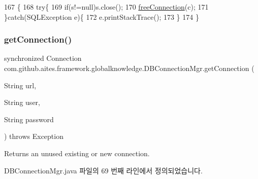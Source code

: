 \begin{DoxyCode}
167                                                          \{
168         \textcolor{keywordflow}{try}\{
169             \textcolor{keywordflow}{if}(s!=null)s.close();
170             \mbox{\hyperlink{classcom_1_1github_1_1aites_1_1framework_1_1globalknowledge_1_1_d_b_connection_mgr_a4c1302a674f9c74b55f6fae96bf79b64}{freeConnection}}(c);
171         \}\textcolor{keywordflow}{catch}(SQLException e)\{
172             e.printStackTrace();
173         \}
174     \}
\end{DoxyCode}
\mbox{\label{classcom_1_1github_1_1aites_1_1framework_1_1globalknowledge_1_1_d_b_connection_mgr_a9617a483f23c094ac0d6c2096f748d04}} 
\subsubsection{\texorpdfstring{get\+Connection()}{getConnection()}}
{\footnotesize\ttfamily synchronized Connection com.\+github.\+aites.\+framework.\+globalknowledge.\+D\+B\+Connection\+Mgr.\+get\+Connection (\begin{DoxyParamCaption}\item[{String}]{url,  }\item[{String}]{user,  }\item[{String}]{password }\end{DoxyParamCaption}) throws Exception}



Returns an unused existing or new connection. 



D\+B\+Connection\+Mgr.\+java 파일의 69 번째 라인에서 정의되었습니다.


